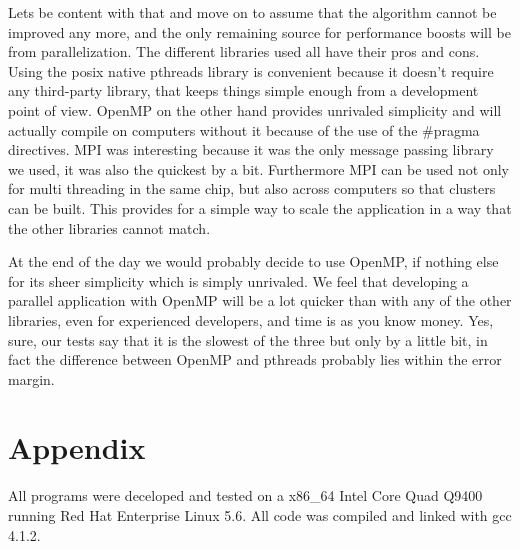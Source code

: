 \documentclass[11pt,a4paper]{article}
\begin{document}
Lets be content with that and move on to assume that the algorithm cannot be improved any more, and the only remaining source for performance boosts will be from parallelization. The different libraries used  all have their pros and cons. Using the posix native pthreads library is convenient because it doesn't require any third-party library, that keeps things simple enough from a development point of view. OpenMP on the other hand provides unrivaled simplicity and will actually compile on computers without it because of the use of the \#pragma directives. MPI was interesting because it was the only message passing library we used, it was also the quickest by a bit. Furthermore MPI can be used not only for multi threading in the same chip, but also across computers so that clusters can be built. This provides for a simple way to scale the application in a way that the other libraries cannot match.

At the end of the day we would probably decide to use OpenMP, if nothing else for its sheer simplicity which is simply unrivaled. We feel that developing a parallel application with OpenMP will be a lot quicker than with any of the other libraries, even for experienced developers, and time is as you know money. Yes, sure, our tests say that it is the slowest of the three but only by a little bit, in fact the difference between OpenMP and pthreads probably lies within the error margin.
\section{Appendix}
All programs were deceloped and tested on a x86\_64 Intel Core Quad Q9400 running Red Hat Enterprise Linux 5.6. All code was compiled and linked with gcc 4.1.2. 
\end{document}
